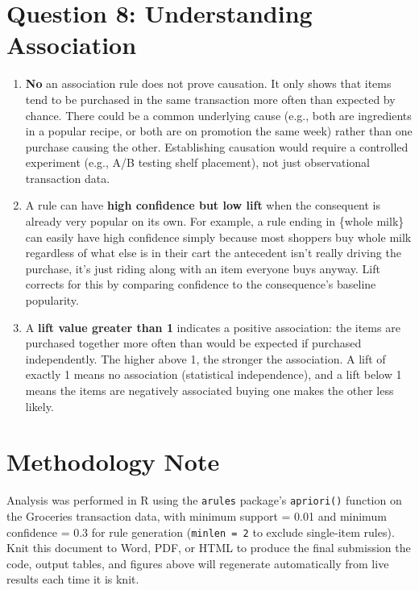 \documentclass[
]{article}
\providecommand{\tightlist}{%
  \setlength{\itemsep}{0pt}\setlength{\parskip}{0pt}}
\begin{document}
\section{Question 8: Understanding
Association}\label{question-8-understanding-association}

\begin{enumerate}
\def\labelenumi{\alph{enumi}.}
\tightlist
\item
  \textbf{No} an association rule does not prove causation. It only
  shows that items tend to be purchased in the same transaction more
  often than expected by chance. There could be a common underlying
  cause (e.g., both are ingredients in a popular recipe, or both are on
  promotion the same week) rather than one purchase causing the other.
  Establishing causation would require a controlled experiment (e.g.,
  A/B testing shelf placement), not just observational transaction data.
\item
  A rule can have \textbf{high confidence but low lift} when the
  consequent is already very popular on its own. For example, a rule
  ending in \{whole milk\} can easily have high confidence simply
  because most shoppers buy whole milk regardless of what else is in
  their cart the antecedent isn't really driving the purchase, it's just
  riding along with an item everyone buys anyway. Lift corrects for this
  by comparing confidence to the consequence's baseline popularity.
\item
  A \textbf{lift value greater than 1} indicates a positive association:
  the items are purchased together more often than would be expected if
  purchased independently. The higher above 1, the stronger the
  association. A lift of exactly 1 means no association (statistical
  independence), and a lift below 1 means the items are negatively
  associated buying one makes the other less likely.
\end{enumerate}

\section{Methodology Note}\label{methodology-note}

Analysis was performed in R using the \texttt{arules} package's
\texttt{apriori()} function on the Groceries transaction data, with
minimum support = 0.01 and minimum confidence = 0.3 for rule generation
(\texttt{minlen\ =\ 2} to exclude single-item rules). Knit this document
to Word, PDF, or HTML to produce the final submission the code, output
tables, and figures above will regenerate automatically from live
results each time it is knit.
\end{document}
